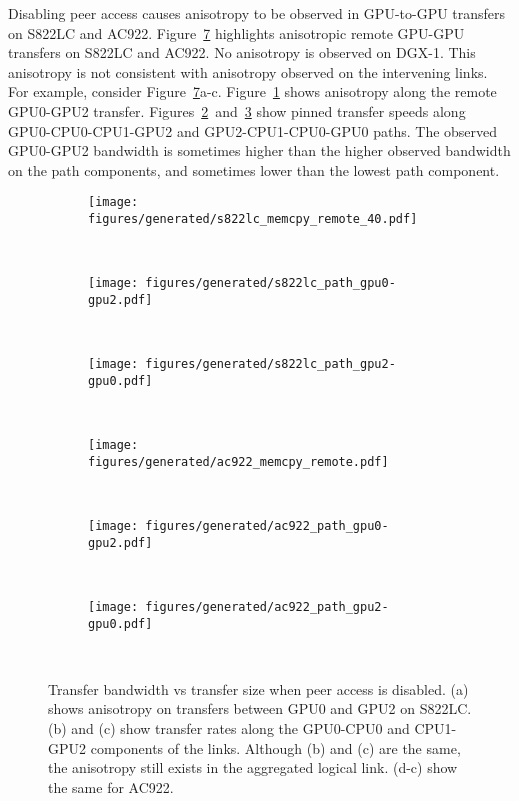 Disabling peer access causes anisotropy to be observed in GPU-to-GPU transfers on S822LC and AC922.
Figure~\ref{fig:explicit-peer-anisotropy} highlights anisotropic remote GPU-GPU transfers on S822LC and AC922.
No anisotropy is observed on DGX-1.
This anisotropy is not consistent with anisotropy observed on the intervening links.
For example, consider Figure~\ref{fig:explicit-peer-anisotropy}a-c.
Figure~\ref{fig:minsky-explicit-nopeer-remote} shows anisotropy along the remote GPU0-GPU2 transfer.
Figures~\ref{fig:minsky-explicit-path-gpu0-gpu2}~and~\ref{fig:minsky-explicit-path-gpu2-gpu0} show pinned transfer speeds along GPU0-CPU0-CPU1-GPU2 and GPU2-CPU1-CPU0-GPU0 paths.
The observed GPU0-GPU2 bandwidth is sometimes higher than the higher observed bandwidth on the path components, and sometimes lower than the lowest path component.


\begin{figure}[ht]
	\centering
	\begin{subfigure}[b]{0.3\textwidth}
		\texttt{[image: figures/generated/s822lc\_memcpy\_remote\_40.pdf]}
		\caption{}
		\label{fig:minsky-explicit-nopeer-remote}
	\end{subfigure}
	~
	\begin{subfigure}[b]{0.3\textwidth}
		\texttt{[image: figures/generated/s822lc\_path\_gpu0-gpu2.pdf]}
		\caption{}
		\label{fig:minsky-explicit-path-gpu0-gpu2}
	\end{subfigure}
	~
	\begin{subfigure}[b]{0.3\textwidth}
		\texttt{[image: figures/generated/s822lc\_path\_gpu2-gpu0.pdf]}
		\caption{}
		\label{fig:minsky-explicit-path-gpu2-gpu0}
	\end{subfigure}
	\\
	\begin{subfigure}[b]{0.3\textwidth}
		\texttt{[image: figures/generated/ac922\_memcpy\_remote.pdf]}
		\caption{}
		\label{fig:explicit-ac922-nopeer-remote}
	\end{subfigure}
	~
	\begin{subfigure}[b]{0.3\textwidth}
		\texttt{[image: figures/generated/ac922\_path\_gpu0-gpu2.pdf]}
		\caption{}
		\label{fig:ac922-explicit-path-gpu0-gpu2}
	\end{subfigure}
	~
	\begin{subfigure}[b]{0.3\textwidth}
		\texttt{[image: figures/generated/ac922\_path\_gpu2-gpu0.pdf]}
		\caption{}
		\label{fig:ac922-explicit-path-gpu2-gpu0}
	\end{subfigure}
	~
	\caption[Peer Access and GPU-GPU Transfer Bandwidth]{
		Transfer bandwidth vs transfer size when peer access is disabled.
		(a) shows anisotropy on transfers between GPU0 and GPU2 on S822LC.
		(b) and (c) show transfer rates along the GPU0-CPU0 and CPU1-GPU2 components of the links.
		Although (b) and (c) are the same, the anisotropy still exists in the aggregated logical link.
		(d-c) show the same for AC922.
	}
	\label{fig:explicit-peer-anisotropy}
\end{figure}

